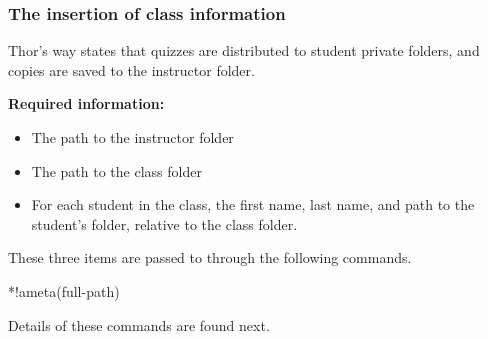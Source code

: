 \documentclass{article}
\begin{document}
\subsubsection{The insertion of class information}\label{sss:CI}

Thor's way states that quizzes are distributed to student private folders, and copies
are saved to the instructor folder.

\newtopic\noindent\textbf{Required information:}
\begin{itemize}
    \item The path to the instructor folder
    \item The path to the class folder
    \item For each student in the class, the first name, last name, and path to the student's folder, relative
      to the class folder.
\end{itemize}
These three items are passed to  through the following commands.
\bVerb{}%
\setlength{\eflength}{\bxSize}%
\def\1{\rlap{\hskip\eflength\textsf{wd:\,}\cs{PTFW}\textsf{, ht:\,}\cs{DefaultHeightOfWidget}}}%
\begin{dCmd}[commandchars=!()]{\bxSize}
*{!ameta(full-path)}
\end{dCmd}
\eVerb Details of these commands are found next.
\end{document}
